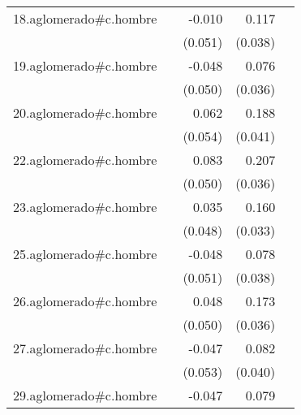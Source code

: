 {\begin{longtable}{l*{4}{D{.}{.}{-1}}}
\addlinespace
18.aglomerado#c.hombre&                     &      -0.010         &       0.117\sym{**} &                     \\
            &                     &     (0.051)         &     (0.038)         &                     \\
\addlinespace
19.aglomerado#c.hombre&                     &      -0.048         &       0.076\sym{*}  &                     \\
            &                     &     (0.050)         &     (0.036)         &                     \\
\addlinespace
20.aglomerado#c.hombre&                     &       0.062         &       0.188\sym{***}&                     \\
            &                     &     (0.054)         &     (0.041)         &                     \\
\addlinespace
22.aglomerado#c.hombre&                     &       0.083         &       0.207\sym{***}&                     \\
            &                     &     (0.050)         &     (0.036)         &                     \\
\addlinespace
23.aglomerado#c.hombre&                     &       0.035         &       0.160\sym{***}&                     \\
            &                     &     (0.048)         &     (0.033)         &                     \\
\addlinespace
25.aglomerado#c.hombre&                     &      -0.048         &       0.078\sym{*}  &                     \\
            &                     &     (0.051)         &     (0.038)         &                     \\
\addlinespace
26.aglomerado#c.hombre&                     &       0.048         &       0.173\sym{***}&                     \\
            &                     &     (0.050)         &     (0.036)         &                     \\
\addlinespace
27.aglomerado#c.hombre&                     &      -0.047         &       0.082\sym{*}  &                     \\
            &                     &     (0.053)         &     (0.040)         &                     \\
\addlinespace
29.aglomerado#c.hombre&                     &      -0.047         &       0.079\sym{*}  &                     \\

\end{longtable}}
